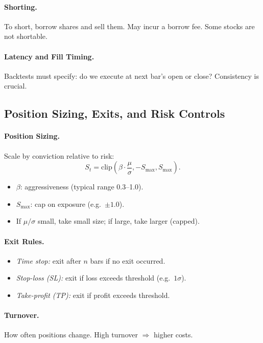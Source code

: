 \documentclass[11pt]{article}
\begin{document}
    \paragraph{Shorting.}
    To short, borrow shares and sell them. May incur a borrow fee. Some stocks are not shortable.

    \paragraph{Latency and Fill Timing.}
    Backtests must specify: do we execute at next bar’s open or close? Consistency is crucial.

    \subsection{Position Sizing, Exits, and Risk Controls}

    \paragraph{Position Sizing.}
    Scale by conviction relative to risk:
    \[
        S_t = \text{clip}\!\left(\beta \cdot \frac{\mu}{\sigma}, -S_{\max}, S_{\max}\right).
    \]
    \begin{itemize}
        \item $\beta$: aggressiveness (typical range 0.3--1.0).
        \item $S_{\max}$: cap on exposure (e.g.\ $\pm 1.0$).
        \item If $\mu/\sigma$ small, take small size; if large, take larger (capped).
    \end{itemize}

    \paragraph{Exit Rules.}
    \begin{itemize}
        \item \emph{Time stop:} exit after $n$ bars if no exit occurred.
        \item \emph{Stop-loss (SL):} exit if loss exceeds threshold (e.g.\ $1\sigma$).
        \item \emph{Take-profit (TP):} exit if profit exceeds threshold.
    \end{itemize}

    \paragraph{Turnover.}
    How often positions change. High turnover $\Rightarrow$ higher costs.
\end{document}
